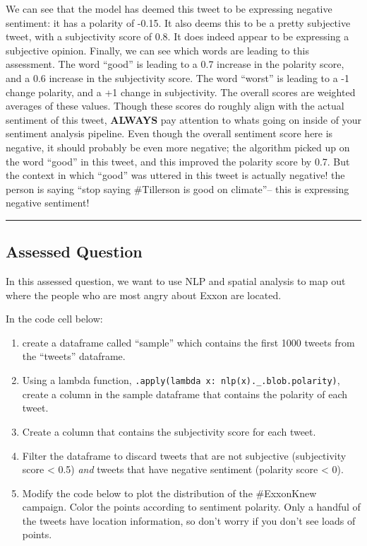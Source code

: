 \documentclass[
  letterpaper,
  DIV=11,
  numbers=noendperiod]{scrreprt}
\begin{document}
We can see that the model has deemed this tweet to be expressing
negative sentiment: it has a polarity of -0.15. It also deems this to be
a pretty subjective tweet, with a subjectivity score of 0.8. It does
indeed appear to be expressing a subjective opinion. Finally, we can see
which words are leading to this assessment. The word ``good'' is leading
to a 0.7 increase in the polarity score, and a 0.6 increase in the
subjectivity score. The word ``worst'' is leading to a -1 change
polarity, and a +1 change in subjectivity. The overall scores are
weighted averages of these values. Though these scores do roughly align
with the actual sentiment of this tweet, \textbf{ALWAYS} pay attention
to whats going on inside of your sentiment analysis pipeline. Even
though the overall sentiment score here is negative, it should probably
be even more negative; the algorithm picked up on the word ``good'' in
this tweet, and this improved the polarity score by 0.7. But the context
in which ``good'' was uttered in this tweet is actually negative! the
person is saying ``stop saying \#Tillerson is good on climate''-- this
is expressing negative sentiment!

\begin{center}\rule{0.5\linewidth}{0.5pt}\end{center}

\hypertarget{assessed-question-3}{%
\subsection{Assessed Question}\label{assessed-question-3}}

In this assessed question, we want to use NLP and spatial analysis to
map out where the people who are most angry about Exxon are located.

In the code cell below:

\begin{enumerate}
\def\labelenumi{\arabic{enumi}.}
\item
  create a dataframe called ``sample'' which contains the first 1000
  tweets from the ``tweets'' dataframe.
\item
  Using a lambda function,
  \texttt{.apply(lambda\ x:\ nlp(x).\_.blob.polarity)}, create a column
  in the sample dataframe that contains the polarity of each tweet.
\item
  Create a column that contains the subjectivity score for each tweet.
\item
  Filter the dataframe to discard tweets that are not subjective
  (subjectivity score \textless{} 0.5) \emph{and} tweets that have
  negative sentiment (polarity score \textless{} 0).
\item
  Modify the code below to plot the distribution of the \#ExxonKnew
  campaign. Color the points according to sentiment polarity. Only a
  handful of the tweets have location information, so don't worry if you
  don't see loads of points.
\end{enumerate}
\end{document}
